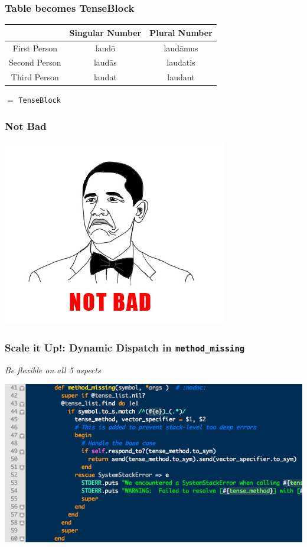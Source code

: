 \documentclass[slidestop,compress,mathserif]{beamer}
\begin{document}
\begin{frame}
	\frametitle{Table becomes TenseBlock}
	\begin{center}
		\begin{tabular}{|c|c|c|}
			\hline
			  & Singular Number &  Plural Number\\
			\hline
			First Person  & laud\={o}  & laud\={a}mus\\
			Second Person & laud\={a}s & laudatis \\
			Third Person  & laudat     & laudant \\
			\hline
		\end{tabular}
		\vskip 0.5cm
		$=$
		\vskip 0.5cm
		\texttt{TenseBlock}
	\end{center}
\end{frame}

\begin{frame}
	\frametitle{Not Bad}
	\includegraphics[scale=0.75]{img/not_bad.png}
\end{frame}

\begin{frame}
	\frametitle{Scale it Up!: Dynamic Dispatch in \texttt{method\_missing}}
	\begin{center}
		\emph{Be flexible on all 5 aspects}
	\end{center}
	\includegraphics[scale=0.45]{img/lv_mm.png}
\end{frame}
\end{document}
